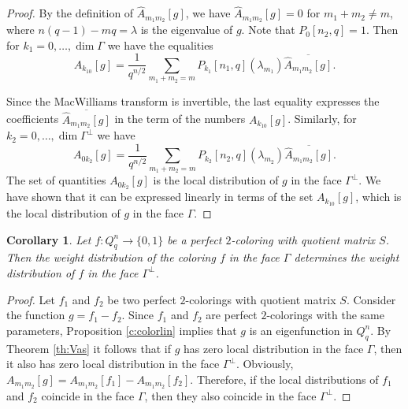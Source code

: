 \documentclass[11pt]{article}
\newtheorem{corollary}{Corollary}[section]
\theoremstyle{definition}
\begin{document}
{{{\begin{proof}
By the definition of $\widehat{A}_{m_1m_2}[g]$, we have  $\widehat{A}_{m_1m_2}[g]=0$ for $m_1+m_2\neq m$, where $n(q-1)-mq=\lambda$ is the eigenvalue of $g$. Note that $P_{0}[n_2,q]=1$. Then for $k_1=0,\dots,\dim \Gamma$ we have the equalities
\begin{equation}\label{eq:thV}
A_{k_10}[g]=\frac{1}{q^{n/2}}\sum\limits_{m_1+m_2=m}
P_{k_1}[n_1,q](\lambda_{m_1}) \overline{\widehat{A}_{m_1m_2}[g]}.
\end{equation}

Since the MacWilliams transform is invertible,  the last equality expresses the coefficients $\overline{\widehat{A}_{m_1m_2}[g]}$ in the term of the numbers $A_{k_10}[g]$. Similarly, for $k_2=0,\dots,\dim \Gamma^\perp$ we have
$$
A_{0k_2}[g]=\frac{1}{q^{n/2}}\sum\limits_{m_1+m_2=m}
P_{k_2}[n_2,q](\lambda_{m_2}) \overline{\widehat{A}_{m_1m_2}[g]}.
$$
The set of quantities $A_{0k_2}[g]$ is the local distribution of $g$ in the face $\Gamma^\perp$. We have shown that it can be expressed linearly in terms of the set $A_{k_10}[g]$, which is the local distribution of $g$ in the face $\Gamma$.
\end{proof}

\begin{corollary}
Let $f:Q^n_q\rightarrow \{0,1\}$ be a perfect $2$-coloring with quotient matrix $S$. Then the weight distribution of the coloring $f$ in the face $\Gamma$ determines the weight distribution of $f$ in the face $\Gamma^\perp$.
\end{corollary}
\begin{proof}
Let $f_1$ and $f_2$ be two perfect $2$-colorings with quotient matrix $S$. Consider the function $g=f_1-f_2$. Since $f_1$ and $f_2$ are perfect $2$-colorings with the same parameters,  Proposition \ref{c:colorlin} implies that $g$ is an eigenfunction in $Q^n_q$. By Theorem \ref{th:Vas} it follows that if $g$ has zero local distribution in the face $\Gamma$, then it also has zero local distribution in the face $\Gamma^\perp$. Obviously, $A_{m_1m_2}[g]=A_{m_1m_2}[f_1]-A_{m_1m_2}[f_2]$. Therefore, if the local distributions of $f_1$ and $f_2$ coincide in the face $\Gamma$, then they also coincide in the face $\Gamma^\perp$.
\end{proof}

}}}
\end{document}
